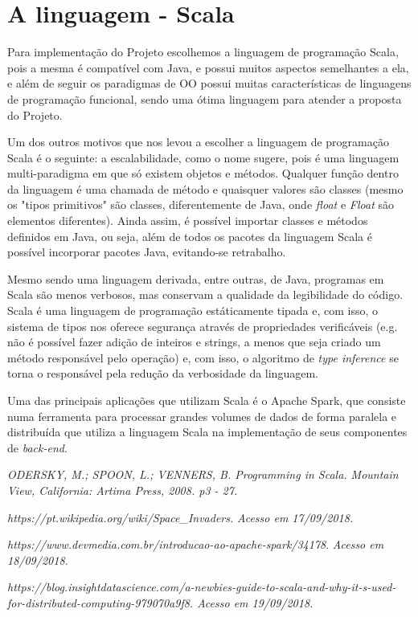 \documentclass[rel_mlp]{iiufrgs}
\begin{document}
%
\chapter{A linguagem - Scala}

Para implementação do Projeto escolhemos a linguagem de programação Scala, pois a mesma é compatível com Java, e possui muitos aspectos semelhantes a ela, e além de seguir os paradigmas de OO possui muitas características de linguagens de programação funcional, sendo uma ótima linguagem para atender a proposta do Projeto.

Um dos outros motivos que nos levou a escolher a linguagem de programação Scala é o seguinte: a escalabilidade, como o nome sugere, pois é uma linguagem multi-paradigma em que só existem objetos e métodos. Qualquer função dentro da linguagem é uma chamada de método e quaisquer valores são classes (mesmo os "tipos primitivos" são classes, diferentemente de Java, onde \textit{float} e\textit{ Float} são elementos diferentes). Ainda assim, é possível importar classes e métodos definidos em Java, ou seja, além de todos os pacotes da linguagem Scala é possível incorporar pacotes Java, evitando-se retrabalho.

Mesmo sendo uma linguagem derivada, entre outras, de Java, programas em Scala são menos verbosos, mas conservam a qualidade da legibilidade do código. Scala é uma linguagem de programação estáticamente tipada e, com isso, o sistema de tipos nos oferece segurança através de propriedades verificáveis (e.g. não é possível fazer adição de inteiros e strings, a menos que seja criado um método responsável pelo operação) e, com isso, o algoritmo de \textit{type inference} se torna o responsável pela redução da verbosidade da linguagem.

Uma das principais aplicações que utilizam Scala é o Apache Spark, que consiste numa ferramenta para processar grandes volumes de dados de forma paralela e distribuída que utiliza a linguagem Scala na implementação de seus componentes de \textit{back-end}.
%

%






\noindent \textit{ODERSKY, M.; SPOON, L.; VENNERS, B. Programming in Scala. Mountain View, California: Artima Press, 2008. p3 - 27.}

\noindent\textit{ https://pt.wikipedia.org/wiki/Space_Invaders.}\textit{ Acesso em 17/09/2018.}

\noindent\textit{ https://www.devmedia.com.br/introducao-ao-apache-spark/34178}. \textit{Acesso em 18/09/2018.}

\noindent\textit{https://blog.insightdatascience.com/a-newbies-guide-to-scala-and-why-it-s-used-for-distributed-computing-979070a9f8. Acesso em 19/09/2018.}
\end{document}
